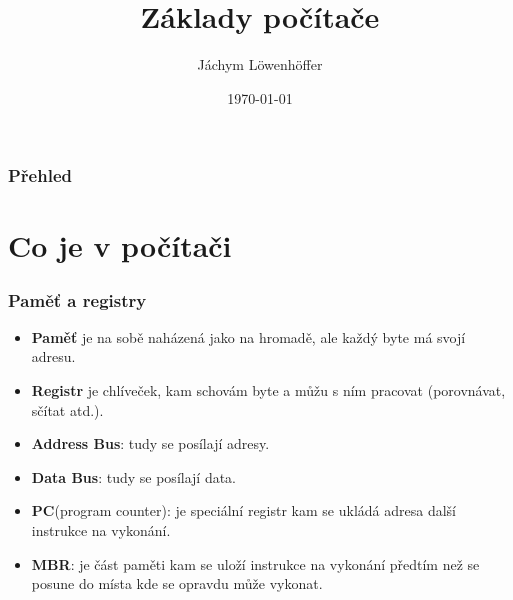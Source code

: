 \documentclass{beamer}
\title[amogus]{Základy počítače} %
\author{Jáchym Löwenhöffer} %
\institute[GEVO] %
{
Gynekologická Evaluace Velkých Obrazů \\ %
\medskip
\textit{jachym.lowenhoffer@gmail.com} %
}
\date{\today} %
\begin{document}
\begin{frame}
	\titlepage %
\end{frame}

\begin{frame}
	\frametitle{Přehled} %
	\tableofcontents %
\end{frame}


\section{Co je v počítači} %



\begin{frame}
	\frametitle{Paměť a registry}
	\begin{itemize}
		\item \textbf{Paměť} je na sobě naházená jako na hromadě, ale každý byte má svojí
		      adresu.
		\item  \textbf{Registr} je chlíveček, kam schovám byte a můžu s ním pracovat
		      (porovnávat, sčítat atd.).
		\item \textbf{Address Bus}: tudy se posílají adresy.
		\item \textbf{Data Bus}: tudy se posílají data.
		\item \textbf{PC}(program counter): je speciální registr kam se ukládá adresa další instrukce
		 na vykonání.
		\item \textbf{MBR}: je část paměti kam se uloží
		 instrukce na vykonání předtím než se posune do místa kde se opravdu může
		 vykonat.
	\end{itemize}
\end{frame}
\end{document}
